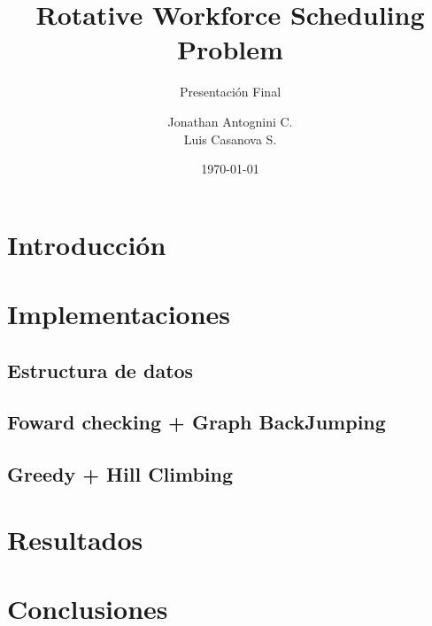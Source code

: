 \documentclass{beamer}
\title{Rotative Workforce Scheduling Problem}
\subtitle{Presentación Final}
\author{Jonathan Antognini C.\\
		Luis Casanova S.
}
\institute[]{Universidad Técnica Federico Santa María}
\date{\today}
\begin{document}
    \frame{\titlepage}
    \frame{\tableofcontents}
	\section{Introducción}
		
	
	\section{Implementaciones}
		\subsection{Estructura de datos}
		
		\subsection{Foward checking + Graph BackJumping}
		
		\subsection{Greedy + Hill Climbing}
		

	\section{Resultados}
		

	\section{Conclusiones}
			
\end{document}
